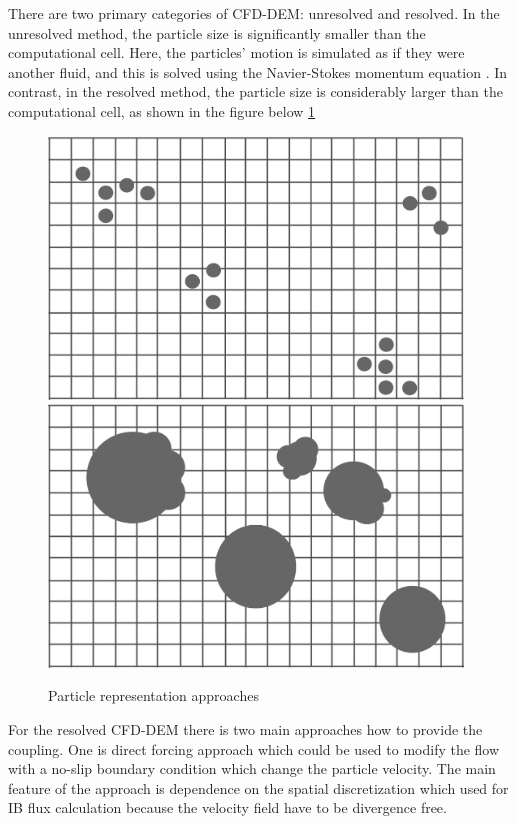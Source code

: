 There are two primary categories of CFD-DEM: unresolved and resolved. In the unresolved method, the particle size is significantly smaller than the computational cell. Here, the particles' motion is simulated as if they were another fluid, and this is solved using the Navier-Stokes momentum equation \cite{kloss2012models}. In contrast, in the resolved method, the particle size is considerably larger than the computational cell, as shown in the figure below \ref{fig:res_unres}
\begin{figure}[h]
    \centering
    \includegraphics[width=11cm]{Images/resolved_cfddem.png}
    \includegraphics[width=11cm]{Images/unresolved_cfddem.png}
    \caption{Particle representation approaches}
    \label{fig:res_unres}
\end{figure}
For the resolved CFD-DEM there is two main approaches how to provide the coupling. One is direct forcing approach\cite{uhlmann2005immersed} which could be used to modify the flow with a no-slip boundary condition which change the particle velocity. The main feature of the approach is dependence on the spatial discretization which used for IB flux calculation because the velocity field have to be divergence free.

